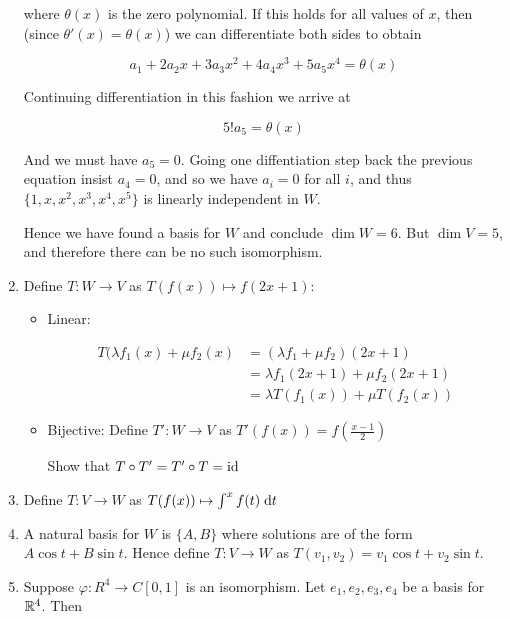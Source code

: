 \documentclass[a4paper]{article}
\begin{document}
\begin{enumerate}[label = (\alph*)]
		where $ \theta(x) $ is the zero polynomial. If this holds for all values of $ x $, then (since $ \theta'(x) = \theta(x) $) we can differentiate both sides to obtain 
		
		\[ a_{1} + 2a_{2} x + 3 a_{3} x^{2} + 4 a_{4} x^{3} + 5 a_{5} x^{4} = \theta(x) \]
		
		Continuing differentiation in this fashion we arrive at
		
		\[ 5! a_{5} = \theta(x) \]
		
		And we must have $ a_{5} = 0 $. Going one diffentiation step back the previous equation insist $ a_{4} = 0 $, and so we have $ a_{i} = 0 $ for all $ i $, and thus  $ \{1,x,x^{2},x^{3},x^{4},x^{5}\} $ is linearly independent in $ W $. 
		
		Hence we have found a basis for $ W $ and conclude $ \dim W = 6 $. But $ \dim V = 5$, and therefore there can be no such isomorphism.
		
		
		\item Define $ T : W \to V $ as $ T(f(x)) \mapsto f(2x + 1) $:
		
		\begin{itemize}
			\item Linear: 
			
			\begin{align*}
			T(\lambda f_{1}(x) + \mu f_{2}(x)& = (\lambda f_{1} + \mu f_{2})(2x + 1) \\
			& = \lambda f_{1} (2x + 1) + \mu f_{2} (2x + 1)\\
			& = \lambda T(f_{1}(x)) + \mu T(f_{2}(x))
			\end{align*}
			
			\item Bijective: Define $ T':W \to V $ as $ T'(f(x)) = f(\frac{x-1}{2}) $ 
			
			Show that $ T \circ T' = T' \circ T = \operatorname{id} $
			
		\end{itemize}
		
		\item Define $ T : V \to W $ as $ T(f(x)) \mapsto \int^{x} f(t) \; \mathrm{d} t $
		
		\item A natural basis for $ W $ is $ \{ A,B \} $ where solutions are of the form $ A \cos t + B \sin t $. Hence define $ T : V \to W $ as $ T(v_{1},v_{2}) = v_{1} \cos t + v_{2} \sin t $.
		
		\item Suppose $ \varphi : R^{4} \to C[0,1] $ is an isomorphism. Let $ e_{1},e_{2},e_{3},e_{4} $ be a basis for $ \mathbb{R}^{4} $. Then 
		

\end{enumerate}
\end{document}
